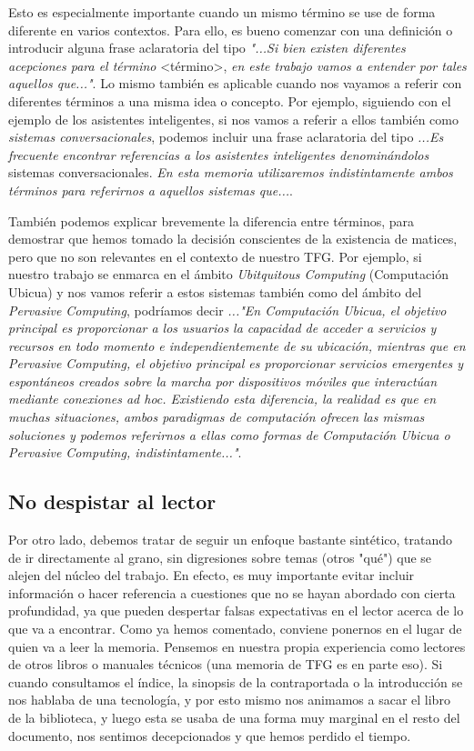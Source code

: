 Esto es especialmente importante cuando un mismo término se use de forma diferente en varios contextos. Para ello, es bueno comenzar con una definición o introducir alguna frase aclaratoria del tipo \textit{"...Si bien existen diferentes acepciones para el término} \textless término\textgreater, \textit{en este trabajo vamos a entender por tales aquellos que..."}. Lo mismo también es aplicable cuando nos vayamos a referir con diferentes términos a una misma idea o concepto. Por ejemplo, siguiendo con el ejemplo de los asistentes inteligentes, si nos vamos a referir a ellos también como \textit{sistemas conversacionales}, podemos incluir una frase aclaratoria del tipo \textit{...Es frecuente encontrar referencias a los asistentes inteligentes denominándolos } sistemas conversacionales. \textit{En esta memoria utilizaremos indistintamente ambos términos para referirnos a aquellos sistemas que...}.

También podemos explicar brevemente la diferencia entre términos, para demostrar que hemos tomado la decisión conscientes de la existencia de matices, pero que no son relevantes en el contexto de nuestro TFG. Por ejemplo, si nuestro trabajo se enmarca en el ámbito \textit{Ubitquitous Computing} (Computación Ubicua) y nos vamos referir a estos sistemas también como del ámbito del \textit{Pervasive Computing}, podríamos decir \textit{..."En Computación Ubicua, el objetivo principal es proporcionar a los usuarios la capacidad de acceder a servicios y recursos en todo momento e independientemente de su ubicación, mientras que en Pervasive Computing, el objetivo principal es proporcionar servicios emergentes y espontáneos creados sobre la marcha por dispositivos móviles que interactúan mediante conexiones ad hoc. Existiendo esta diferencia, la realidad es que en muchas situaciones, ambos paradigmas de computación ofrecen las mismas soluciones y podemos referirnos a ellas como formas de Computación Ubicua o Pervasive Computing, indistintamente..."}.

\subsection{No despistar al lector}
Por otro lado, debemos tratar de seguir un enfoque bastante sintético, tratando de ir directamente al grano, sin digresiones sobre temas (otros "qué") que  se alejen del núcleo del trabajo. En efecto, es muy importante evitar incluir información o hacer referencia a cuestiones que no se hayan abordado con cierta profundidad, ya que pueden despertar falsas expectativas en el lector acerca de lo que va a encontrar. Como ya hemos comentado, conviene ponernos en el lugar de quien va a leer la memoria. Pensemos en nuestra propia experiencia como lectores de otros libros o manuales técnicos (una memoria de TFG es en parte eso). Si cuando consultamos el índice, la sinopsis de la contraportada o la introducción se nos hablaba de una tecnología, y por esto mismo nos animamos a sacar el libro de la biblioteca, y luego esta se usaba de una forma muy marginal en el resto del documento, nos sentimos decepcionados y que hemos perdido el tiempo.

